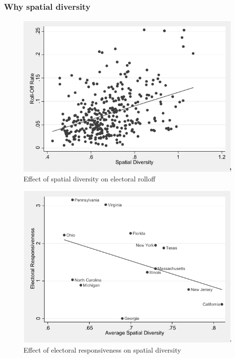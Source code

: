 \documentclass[]{article}
\begin{document}
\hypertarget{why-spatial-diversity}{%
\subsubsection{Why spatial diversity}\label{why-spatial-diversity}}

\begin{figure}
\centering
\includegraphics{img/sd_rolloff.png}
\caption{Effect of spatial diversity on electoral rolloff}
\end{figure}

\begin{figure}
\centering
\includegraphics{./img/average_spatial-diversity.png}
\caption{Effect of electoral responsiveness on spatial diversity
\label{sd_responsiveness}}
\end{figure}
\end{document}
